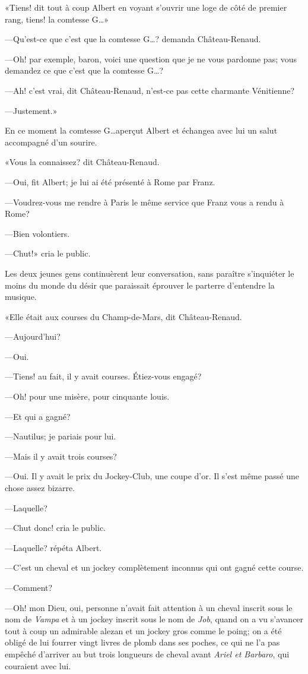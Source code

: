 «Tiens! dit tout à coup Albert en voyant s'ouvrir une loge de côté de premier rang, tiens! la comtesse G\dots» 

—Qu'est-ce que c'est que la comtesse G\dots? demanda Château-Renaud. 

—Oh! par exemple, baron, voici une question que je ne vous pardonne pas; vous demandez ce que c'est que la comtesse G\dots? 

—Ah! c'est vrai, dit Château-Renaud, n'est-ce pas cette charmante Vénitienne? 

—Justement.» 

En ce moment la comtesse G\dots aperçut Albert et échangea avec lui un salut accompagné d'un sourire. 

«Vous la connaissez? dit Château-Renaud. 

—Oui, fit Albert; je lui ai été présenté à Rome par Franz. 

—Voudrez-vous me rendre à Paris le même service que Franz vous a rendu à Rome? 

—Bien volontiers.  

—Chut!» cria le public. 

Les deux jeunes gens continuèrent leur conversation, sans paraître s'inquiéter le moins du monde du désir que paraissait éprouver le parterre d'entendre la musique. 

«Elle était aux courses du Champ-de-Mars, dit Château-Renaud. 

—Aujourd'hui? 

—Oui. 

—Tiens! au fait, il y avait courses. Étiez-vous engagé? 

—Oh! pour une misère, pour cinquante louis. 

—Et qui a gagné? 

—Nautilus; je pariais pour lui. 

—Mais il y avait trois courses? 

—Oui. Il y avait le prix du Jockey-Club, une coupe d'or. Il s'est même passé une chose assez bizarre. 

—Laquelle? 

—Chut donc! cria le public. 

—Laquelle? répéta Albert. 

—C'est un cheval et un jockey complètement inconnus qui ont gagné cette course. 

—Comment? 

—Oh! mon Dieu, oui, personne n'avait fait attention à un cheval inscrit sous le nom de \textit{Vampa} et à un jockey inscrit sous le nom de \textit{Job}, quand on a vu s'avancer tout à coup un admirable alezan et un jockey gros comme le poing; on a été obligé de lui fourrer vingt livres de plomb dans ses poches, ce qui ne l'a pas empêché d'arriver au but trois longueurs de cheval avant \textit{Ariel et Barbaro}, qui couraient avec lui. 

